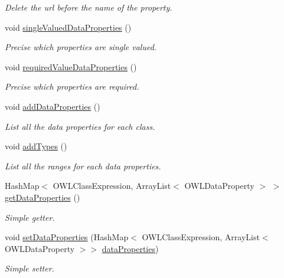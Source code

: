 \begin{DoxyCompactItemize}
\begin{DoxyCompactList}\small\item\em Delete the url before the name of the property. \end{DoxyCompactList}\item 
void \hyperlink{class_ontology_1_1_data_property_a5b082464ba431055164a63d976006916}{singleValuedDataProperties} ()
\begin{DoxyCompactList}\small\item\em Precise which properties are single valued. \end{DoxyCompactList}\item 
void \hyperlink{class_ontology_1_1_data_property_a04c8a57a7b625f5075d407540980946e}{requiredValueDataProperties} ()
\begin{DoxyCompactList}\small\item\em Precise which properties are required. \end{DoxyCompactList}\item 
void \hyperlink{class_ontology_1_1_data_property_ab585a75a37b556425a74d5861e761046}{addDataProperties} ()
\begin{DoxyCompactList}\small\item\em List all the data properties for each class. \end{DoxyCompactList}\item 
void \hyperlink{class_ontology_1_1_data_property_a5773fd26f41397dbc83d8f3fcd0ea311}{addTypes} ()
\begin{DoxyCompactList}\small\item\em List all the ranges for each data properties. \end{DoxyCompactList}\item 
HashMap$<$ OWLClassExpression, ArrayList$<$ OWLDataProperty $>$ $>$ \hyperlink{class_ontology_1_1_data_property_a5466224f71a03956a98911e60d8318d2}{getDataProperties} ()
\begin{DoxyCompactList}\small\item\em Simple getter. \end{DoxyCompactList}\item 
void \hyperlink{class_ontology_1_1_data_property_a69d287f17078104f18872dcd54aee52b}{setDataProperties} (HashMap$<$ OWLClassExpression, ArrayList$<$ OWLDataProperty $>$$>$ \hyperlink{class_ontology_1_1_data_property_af2428254ca584e305288b51f6645e250}{dataProperties})
\begin{DoxyCompactList}\small\item\em Simple setter. \end{DoxyCompactList}\item 
$$
\end{DoxyCompactItemize}
